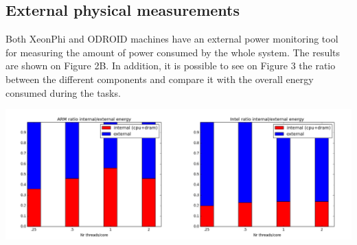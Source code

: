 \documentclass[portrait,a1,final]{a0poster} %
\newcommand{\sectionspace}{10mm} %
\newcommand{\figurespace}{10mm} %
\begin{document}
\begin{minipage}[tc]{0.9\linewidth}
\begin{minipage}[t]{0.5\linewidth}
\vspace{\sectionspace}

\subsection {External physical measurements}
Both XeonPhi and ODROID machines have an external power monitoring tool for measuring the amount of power consumed by the whole system. The results are shown on Figure 2B. In addition, it is possible to see on Figure 3 the ratio between the different components and compare it with the overall energy consumed during the tasks.
\vspace{\figurespace}

\begin{center}
  	\includegraphics[width=.85\linewidth]{./figs/2ratio.png}
\end{center}
\vspace{\figurespace}


\vspace{\figurespace}





\end{minipage}
\end{minipage} %
\end{document}

